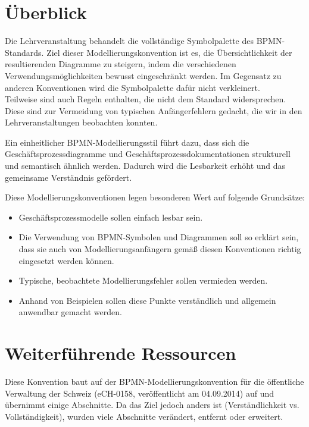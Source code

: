 \documentclass[12pt,report]{../../Templates/snetTeaching}
\begin{document}
\section{Überblick}

Die Lehrveranstaltung \lvname{} behandelt die vollständige Symbolpalette des BPMN-Standards. Ziel dieser Modellierungskonvention ist es, die Übersichtlichkeit der resultierenden Diagramme zu steigern, indem die verschiedenen Verwendungsmöglichkeiten bewusst eingeschränkt werden. Im Gegensatz zu anderen Konventionen wird die Symbolpalette dafür nicht verkleinert. \\
Teilweise sind auch Regeln enthalten, die nicht dem Standard widersprechen. Diese sind zur Vermeidung von typischen Anfängerfehlern gedacht, die wir in den Lehrveranstaltungen beobachten konnten.

Ein einheitlicher BPMN-Modellierungsstil führt dazu, dass sich die Geschäftsprozessdiagramme und Geschäftsprozessdokumentationen strukturell und semantisch ähnlich werden. Dadurch wird die Lesbarkeit erhöht und das gemeinsame Verständnis gefördert.

Diese Modellierungskonventionen legen besonderen Wert auf folgende Grundsätze:

\begin{itemize}
	\item Geschäftsprozessmodelle sollen einfach lesbar sein.
	
	\item Die Verwendung von BPMN-Symbolen und Diagrammen soll so erklärt sein, dass sie auch von Modellierungsanfängern gemäß diesen Konventionen richtig eingesetzt werden können.
	
	\item Typische, beobachtete Modellierungsfehler sollen vermieden werden.
	
	\item Anhand von Beispielen sollen diese Punkte verständlich und allgemein anwendbar gemacht werden.
\end{itemize}

\section{Weiterführende Ressourcen}

Diese Konvention baut auf der BPMN-Modellierungskonvention für die öffentliche Verwaltung der Schweiz (eCH-0158, veröffentlicht am 04.09.2014) auf und übernimmt einige Abschnitte. Da das Ziel jedoch anders ist (Verständlichkeit vs. Vollständigkeit), wurden viele Abschnitte verändert, entfernt oder erweitert.
\end{document}
